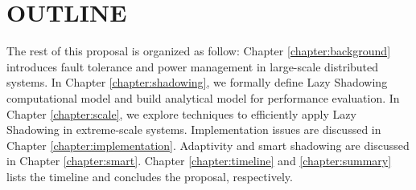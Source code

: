 \section{OUTLINE}
\label{outline}
The rest of this proposal is organized as follow:  
Chapter \ref{chapter:background} introduces fault tolerance and power management in large-scale distributed systems.
In Chapter \ref{chapter:shadowing}, we formally define Lazy Shadowing computational model and build analytical model for performance 
evaluation.
In Chapter \ref{chapter:scale}, we explore techniques to efficiently apply Lazy Shadowing in extreme-scale systems. 
Implementation issues are discussed in Chapter \ref{chapter:implementation}. Adaptivity and smart shadowing are discussed in Chapter \ref{chapter:smart}.
Chapter \ref{chapter:timeline} and \ref{chapter:summary} lists the timeline and concludes the proposal, respectively.








